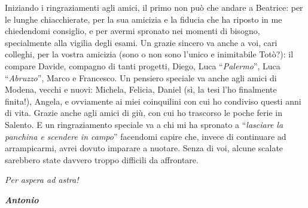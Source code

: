Iniziando i ringraziamenti agli amici, il primo non può che andare a Beatrice: per le lunghe chiacchierate, per la sua amicizia e la fiducia che ha riposto in me chiedendomi consiglio, e per avermi spronato nei momenti di bisogno, specialmente alla vigilia degli esami. Un grazie sincero va anche a voi, cari colleghi, per la vostra amicizia (sono o non sono l'unico e inimitabile Totò?): il compare Davide, compagno di tanti progetti, Diego, Luca “\textit{Palermo}”, Luca “\textit{Abruzzo}”, Marco e Francesco. Un pensiero speciale va anche agli amici di Modena, vecchi e nuovi: Michela, Felicia, Daniel (sì, la tesi l'ho finalmente finita!), Angela, e ovviamente ai miei coinquilini con cui ho condiviso questi anni di vita. Grazie anche agli amici di giù, con cui ho trascorso le poche ferie in Salento. E un ringraziamento speciale va a chi mi ha spronato a “\textit{lasciare la panchina e scendere in campo}” facendomi capire che, invece di continuare ad arrampicarmi, avrei dovuto imparare a nuotare. Senza di voi, alcune scalate sarebbero state davvero troppo difficili da affrontare.

\noindent \textit{Per aspera ad astra!}

\begin{flushright}
    \textbf{\textit{Antonio}}
\end{flushright}